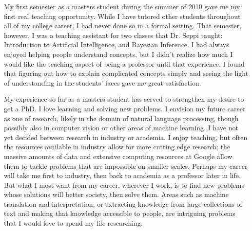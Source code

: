 \documentclass[onecolumn, 12pt]{article}
\begin{document}
My first semester as a masters student during the summer of 2010 gave me my
first real teaching opportunity.  While I have tutored other students
throughout all of my college career, I had never done so in a formal setting.
That semester, however, I was a teaching assistant for two classes that Dr.
Seppi taught: Introduction to Artificial Intelligence, and Bayesian Inference.
I had always enjoyed helping people understand concepts, but I didn't realize
how much I would like the teaching aspect of being a professor until that
experience.  I found that figuring out how to explain complicated concepts
simply and seeing the light of understanding in the students' faces gave me
great satisfaction.

My experience so far as a masters student has served to strengthen my desire to
get a PhD.  I love learning and solving new problems.  I envision my future
career as one of research, likely in the domain of natural language processing,
though possibly also in computer vision or other areas of machine learning.  I
have not yet decided between research in industry or academia.  I enjoy
teaching, but often the resources available in industry allow for more cutting
edge research; the massive amounts of data and extensive computing resources at
Google allow them to tackle problems that are impossible on smaller scales.
Perhaps my career will take me first to industry, then back to academia as a
professor later in life.  But what I most want from my career, wherever I work,
is to find new problems whose solutions will better society, then solve them.
Areas such as machine translation and interpretation, or extracting knowledge
from large collections of text and making that knowledge accessible to people,
are intriguing problems that I would love to spend my life researching.
\end{document}
